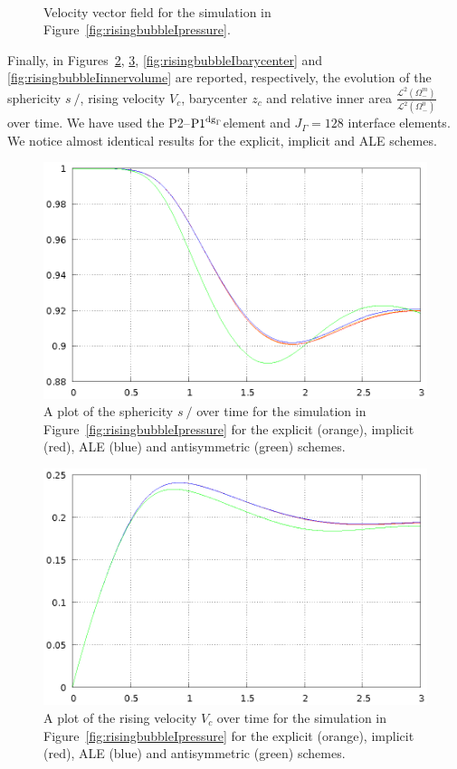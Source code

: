 \documentclass[a4paper,12pt,onecolumn]{article}
\newcommand{\pdg}{${\rm P1}^{{\rm dg}_\Gamma}$} %
\newcommand{\strikes}{\mbox{$s\!\!\!\!\:/$}}
\begin{document}
\begin{figure}[htbp]
\centering
{}
\\
\caption[Navier--Stokes rising bubble I velocity]
{Velocity vector field for the simulation in
Figure~\ref{fig:risingbubbleIpressure}.}
\label{fig:risingbubbleIvelocity}
\end{figure}

Finally, in Figures~\ref{fig:risingbubbleIsphericity},
\ref{fig:risingbubbleIrisingvelocity}, \ref{fig:risingbubbleIbarycenter} and
\ref{fig:risingbubbleIinnervolume} are reported, respectively, the evolution of
the sphericity $\strikes$, rising velocity $V_c$, barycenter $z_c$ and relative
inner area $\frac{\mathcal{L}^2(\Omega^m_-)}{\mathcal{L}^2(\Omega^0_-)}$ over
time. We have used the P2--\pdg element and $J_\Gamma=128$ interface elements.
We notice almost identical results for the explicit, implicit and ALE schemes.
\begin{figure}[htbp]
\centering
\includegraphics[width=.45\textwidth]
{figures/rising_bubble_I_sphericity.ps}
\caption[Navier--Stokes rising bubble I sphericity]
{A plot of the sphericity $\strikes$ over time for the simulation in
Figure~\ref{fig:risingbubbleIpressure} for the explicit (orange), implicit
(red), ALE (blue) and antisymmetric (green) schemes.}
\label{fig:risingbubbleIsphericity}
\end{figure}

\begin{figure}[htbp]
\centering
\includegraphics[width=.45\textwidth]
{figures/rising_bubble_I_rising_velocity.ps}
\caption[Navier--Stokes rising bubble I rising velocity]
{A plot of the rising velocity $V_c$ over time for the simulation in
Figure~\ref{fig:risingbubbleIpressure} for the explicit (orange), implicit
(red), ALE (blue) and antisymmetric (green) schemes.}
\label{fig:risingbubbleIrisingvelocity}
\end{figure}
\end{document}
